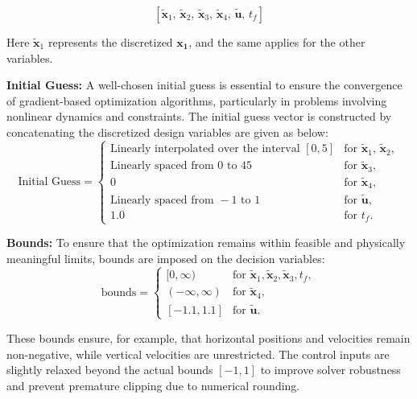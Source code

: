 \begin{equation}
\left[ \tilde{\mathbf{x}}_1,\, \tilde{\mathbf{x}}_2,\, \tilde{\mathbf{x}}_3,\, \tilde{\mathbf{x}}_4,\, \tilde{\mathbf{u}},\, t_f \right]
\tag*{\hfill Design Variables}
\end{equation}


Here $\tilde{\mathbf{x}}_1$ represents the discretized $\mathbf{x_1}$, and the same applies for the other variables.

\vspace{1em}
\noindent\textbf{Initial Guess:}  
A well-chosen initial guess is essential to ensure the convergence of gradient-based optimization algorithms, particularly in problems involving nonlinear dynamics and constraints. The initial guess vector is constructed by concatenating the discretized design variables are given as below:
\begin{equation}
\text{Initial Guess} =
\begin{cases}
\text{Linearly interpolated over the interval } [0, 5] & \text{for } \tilde{\mathbf{x}}_1,\, \tilde{\mathbf{x}}_2, \\
\text{Linearly spaced from } 0 \text{ to } 45 & \text{for } \tilde{\mathbf{x}}_3, \\
0 & \text{for } \tilde{\mathbf{x}}_4, \\
\text{Linearly spaced from } -1 \text{ to } 1 & \text{for } \tilde{\mathbf{u}}, \\
1.0 & \text{for } t_f.
\end{cases}
\end{equation}


\vspace{1em}
\noindent\textbf{Bounds:}  
To ensure that the optimization remains within feasible and physically meaningful limits, bounds are imposed on the decision variables:
\begin{equation}
\text{bounds} =
\begin{cases}
[0, \infty) & \text{for } \tilde{\mathbf{x}}_1, \tilde{\mathbf{x}}_2, \tilde{\mathbf{x}}_3, t_f, \\
(-\infty, \infty) & \text{for } \mathbf{\tilde{x}}_4, \\
[-1.1, 1.1] & \text{for } \mathbf{\tilde{u}}.
\end{cases}
\end{equation}

These bounds ensure, for example, that horizontal positions and velocities remain non-negative, while vertical velocities are unrestricted. The control inputs are slightly relaxed beyond the actual bounds \([-1, 1]\) to improve solver robustness and prevent premature clipping due to numerical rounding.

